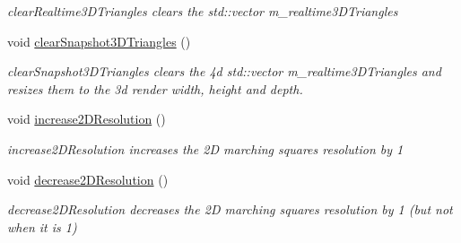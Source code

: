 \begin{DoxyCompactItemize}
\begin{DoxyCompactList}\small\item\em clear\-Realtime3\-D\-Triangles clears the std\-::vector m\-\_\-realtime3\-D\-Triangles \end{DoxyCompactList}\item 
\hypertarget{classMarchingAlgorithms_afb08a29dcb96256be0469b64fde74b05}{void \hyperlink{classMarchingAlgorithms_afb08a29dcb96256be0469b64fde74b05}{clear\-Snapshot3\-D\-Triangles} ()}\label{classMarchingAlgorithms_afb08a29dcb96256be0469b64fde74b05}

\begin{DoxyCompactList}\small\item\em clear\-Snapshot3\-D\-Triangles clears the 4d std\-::vector m\-\_\-realtime3\-D\-Triangles and resizes them to the 3d render width, height and depth. \end{DoxyCompactList}\item 
\hypertarget{classMarchingAlgorithms_a09372b6314026f6045db3b51bc6b8782}{void \hyperlink{classMarchingAlgorithms_a09372b6314026f6045db3b51bc6b8782}{increase2\-D\-Resolution} ()}\label{classMarchingAlgorithms_a09372b6314026f6045db3b51bc6b8782}

\begin{DoxyCompactList}\small\item\em increase2\-D\-Resolution increases the 2\-D marching squares resolution by 1 \end{DoxyCompactList}\item 
\hypertarget{classMarchingAlgorithms_af72442c4c16cb90bf339b63e0a0ff803}{void \hyperlink{classMarchingAlgorithms_af72442c4c16cb90bf339b63e0a0ff803}{decrease2\-D\-Resolution} ()}\label{classMarchingAlgorithms_af72442c4c16cb90bf339b63e0a0ff803}

\begin{DoxyCompactList}\small\item\em decrease2\-D\-Resolution decreases the 2\-D marching squares resolution by 1 (but not when it is 1) \end{DoxyCompactList}\end{DoxyCompactItemize}



